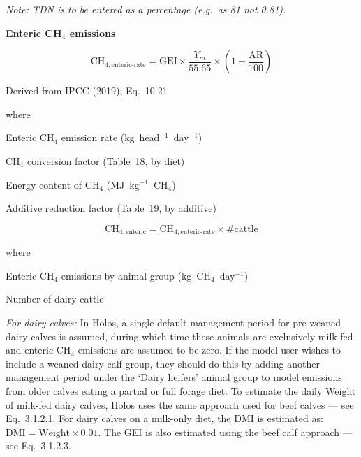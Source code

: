 \noindent\textit{Note: TDN is to be entered as a percentage (e.g.\ as 81 not 0.81).}

\bigskip
\noindent\textbf{Enteric CH$_4$ emissions}

\begin{equation}
    \mathrm{CH}_{4,\mathrm{enteric\text{-}rate}} =
        \mathrm{GEI} \times \frac{Y_m}{55.65}
        \times \left(1 - \frac{\mathrm{AR}}{100}\right)
    \tag{Eq.\ 3.2.1.11}
\end{equation}

\noindent Derived from IPCC (2019), Eq.~10.21

\noindent where
\begin{description}[font=\normalfont, leftmargin=9em, style=sameline, nosep]
    \item[$\mathrm{CH}_{4,\mathrm{enteric\text{-}rate}}$] Enteric CH$_4$ emission rate
          (kg~head$^{-1}$~day$^{-1}$)
    \item[$Y_m$] CH$_4$ conversion factor (Table~18, by diet)
    \item[$55.65$] Energy content of CH$_4$ (MJ~kg$^{-1}$~CH$_4$)
    \item[$\mathrm{AR}$] Additive reduction factor (Table~19, by additive)
\end{description}

\begin{equation}
    \mathrm{CH}_{4,\mathrm{enteric}} =
        \mathrm{CH}_{4,\mathrm{enteric\text{-}rate}} \times \#\mathrm{cattle}
    \tag{Eq.\ 3.2.1.12}
\end{equation}

\noindent where
\begin{description}[font=\normalfont, leftmargin=9em, style=sameline, nosep]
    \item[$\mathrm{CH}_{4,\mathrm{enteric}}$] Enteric CH$_4$ emissions by animal group
          (kg~CH$_4$~day$^{-1}$)
    \item[$\#\mathrm{cattle}$] Number of dairy cattle
\end{description}

\noindent\textit{For dairy calves:} In Holos, a single default management period for
pre-weaned dairy calves is assumed, during which time these animals are exclusively
milk-fed and enteric CH$_4$ emissions are assumed to be zero. If the model user wishes
to include a weaned dairy calf group, they should do this by adding another management
period under the `Dairy heifers' animal group to model emissions from older calves eating
a partial or full forage diet. To estimate the daily Weight of milk-fed dairy calves,
Holos uses the same approach used for beef calves --- see Eq.~3.1.2.1. For dairy calves
on a milk-only diet, the DMI is estimated as: $\mathrm{DMI} = \mathrm{Weight} \times
0.01$. The GEI is also estimated using the beef calf approach --- see Eq.~3.1.2.3.

